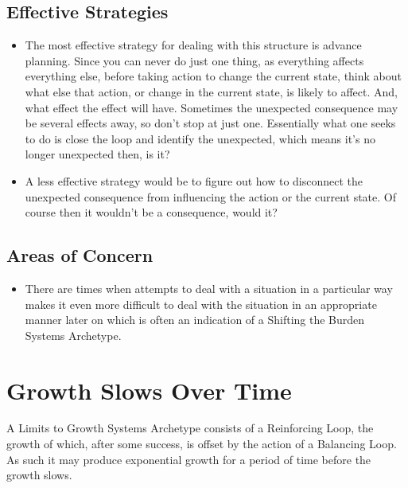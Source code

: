 \documentclass[]{memoir}
\begin{document}
\subsection{Effective Strategies}

\begin{itemize}
\itemsep1pt\parskip0pt
\item
  The most effective strategy for dealing with this structure is advance
  planning. Since you can never do just one thing, as everything affects
  everything else, before taking action to change the current state,
  think about what else that action, or change in the current state, is
  likely to affect. And, what effect the effect will have. Sometimes the
  unexpected consequence may be several effects away, so don't stop at
  just one. Essentially what one seeks to do is close the loop and
  identify the unexpected, which means it's no longer unexpected then,
  is it?
\item
  A less effective strategy would be to figure out how to disconnect the
  unexpected consequence from influencing the action or the current
  state. Of course then it wouldn't be a consequence, would it?
\end{itemize}

\subsection{Areas of Concern}

\begin{itemize}
\itemsep1pt\parskip0pt
\item
  There are times when attempts to deal with a situation in a particular
  way makes it even more difficult to deal with the situation in an
  appropriate manner later on which is often an indication of a Shifting
  the Burden Systems Archetype.
\end{itemize}

\section{Growth Slows Over Time}

A Limits to Growth Systems Archetype consists of a Reinforcing Loop, the
growth of which, after some success, is offset by the action of a
Balancing Loop. As such it may produce exponential growth for a period
of time before the growth slows.

\FloatBarrier 
\end{document}
